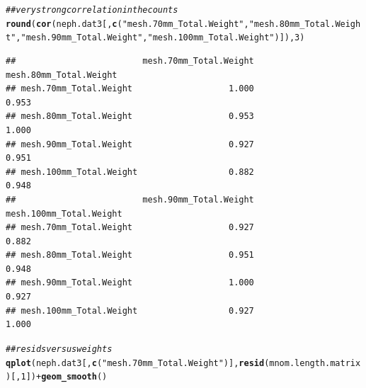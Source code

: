 \documentclass[12pt]{article}\usepackage[]{graphicx}\usepackage[]{color}
\makeatletter
\newcommand{\hlnum}[1]{\textcolor[rgb]{0.686,0.059,0.569}{#1}}%
\newcommand{\hlstr}[1]{\textcolor[rgb]{0.192,0.494,0.8}{#1}}%
\newcommand{\hlcom}[1]{\textcolor[rgb]{0.678,0.584,0.686}{\textit{#1}}}%
\newcommand{\hlopt}[1]{\textcolor[rgb]{0,0,0}{#1}}%
\newcommand{\hlstd}[1]{\textcolor[rgb]{0.345,0.345,0.345}{#1}}%
\newcommand{\hlkwd}[1]{\textcolor[rgb]{0.737,0.353,0.396}{\textbf{#1}}}%
\newenvironment{kframe}{%
 \def\at@end@of@kframe{}%
 \ifinner\ifhmode%
  \def\at@end@of@kframe{\end{minipage}}%
  \begin{minipage}{\columnwidth}%
 \fi\fi%
 \def\FrameCommand##1{\hskip\@totalleftmargin \hskip-\fboxsep
 \colorbox{shadecolor}{##1}\hskip-\fboxsep
     \hskip-\linewidth \hskip-\@totalleftmargin \hskip\columnwidth}%
 \MakeFramed {\advance\hsize-\width
   \@totalleftmargin\z@ \linewidth\hsize
   \@setminipage}}%
 {\par\unskip\endMakeFramed%
 \at@end@of@kframe}
\newenvironment{knitrout}{}{} %
\makeatother
\begin{document}
\begin{knitrout}
\begin{kframe}\begin{alltt}
\hlcom{## very strong correlation in the counts}
\hlkwd{round}\hlstd{(}\hlkwd{cor}\hlstd{(neph.dat3[,} \hlkwd{c}\hlstd{(}\hlstr{"mesh.70mm_Total.Weight"}\hlstd{,} \hlstr{"mesh.80mm_Total.Weight"}\hlstd{,} \hlstr{"mesh.90mm_Total.Weight"}\hlstd{,} \hlstr{"mesh.100mm_Total.Weight"}\hlstd{)]),} \hlnum{3}\hlstd{)}
\end{alltt}
\begin{verbatim}
##                         mesh.70mm_Total.Weight mesh.80mm_Total.Weight
## mesh.70mm_Total.Weight                   1.000                  0.953
## mesh.80mm_Total.Weight                   0.953                  1.000
## mesh.90mm_Total.Weight                   0.927                  0.951
## mesh.100mm_Total.Weight                  0.882                  0.948
##                         mesh.90mm_Total.Weight mesh.100mm_Total.Weight
## mesh.70mm_Total.Weight                   0.927                   0.882
## mesh.80mm_Total.Weight                   0.951                   0.948
## mesh.90mm_Total.Weight                   1.000                   0.927
## mesh.100mm_Total.Weight                  0.927                   1.000
\end{verbatim}
\begin{alltt}
\hlcom{## resids versus weights}
\hlkwd{qplot}\hlstd{(neph.dat3[,} \hlkwd{c}\hlstd{(}\hlstr{"mesh.70mm_Total.Weight"}\hlstd{)],} \hlkwd{resid}\hlstd{(mnom.length.matrix)[,}\hlnum{1}\hlstd{])} \hlopt{+} \hlkwd{geom_smooth}\hlstd{()}
\end{alltt}



\end{kframe}
\end{knitrout}
\end{document}
